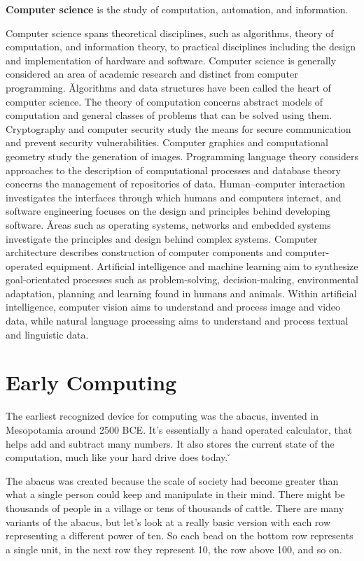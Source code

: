 \textbf{Computer science} is the study of computation, automation, and information.
\ed

Computer science spans theoretical disciplines, such as algorithms, theory of computation, and information theory, to
practical disciplines including the design and implementation of hardware and software. Computer science is generally
considered an area of academic research and distinct from computer programming. \v

Algorithms and data structures have been called the heart of computer science. The theory of computation concerns
abstract models of computation and general classes of problems that can be solved using them. Cryptography and
computer security study the means for secure communication and prevent security vulnerabilities. Computer graphics
and computational geometry study the generation of images. Programming language theory considers approaches to the
description of computational processes and database theory concerns the management of repositories of data.
Human–computer interaction investigates the interfaces through which humans and computers interact, and software
engineering focuses on the design and principles behind developing software. \v

Areas such as operating systems, networks and embedded systems investigate the principles and design behind complex
systems. Computer architecture describes construction of computer components and computer-operated equipment.
Artificial intelligence and machine learning aim to synthesize goal-orientated processes such as problem-solving,
decision-making, environmental adaptation, planning and learning found in humans and animals. Within artificial
intelligence, computer vision aims to understand and process image and video data, while natural language processing
aims to understand and process textual and linguistic data.

\section{Early Computing}

The earliest recognized device for computing was the abacus, invented in Mesopotamia around 2500 BCE. It's
essentially a hand operated calculator, that helps add and subtract many numbers. It also stores the current state of
the computation, much like your hard drive does today. \v


The abacus was created because the scale of society had become greater than what a single person could keep and
manipulate in their mind. There might be thousands of people in a village or tens of thousands of cattle. There are
many variants of the abacus, but let's look at a really basic version with each row representing a different power of
ten. So each bead on the bottom row represents a single unit, in the next row they represent 10, the row above 100,
and so on.

